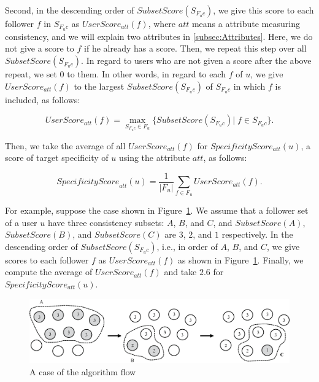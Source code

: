Second, in the descending order of $\mathit{SubsetScore}(S_{F_uc})$, we give
this score to each follower $f$ in $S_{F_uc}$ as
$\mathit{UserScore}_{\mathit{att}}(f)$, where $\mathit{att}$ means a
attribute measuring consistency, and we will explain two attributes in
\ref{subsec:Attributes}. Here, we do not give a score to $f$ if
he already has a score. Then, we repeat this step over all
$\mathit{SubsetScore}(S_{F_uc})$.  In regard to users who are not given
a score after the above repeat, we set $0$ to them.  In other words, in
regard to each $f$ of $u$, we give
$\mathit{UserScore}_{\mathit{att}}(f)$ to the largest
$\mathit{SubsetScore}(S_{F_uc})$ of $S_{F_uc}$ in which $f$ is included,
as follows:

\vspace{-1ex}
\[
 \mathit{UserScore}_{\mathit{att}}(f) = \max_{S_{F_uc} \in F_u}
 \{\mathit{SubsetScore}(S_{F_uc})|\;f \in S_{F_uc}\}.
\]
\vspace{-2ex}

Then, we take the average of all $\mathit{UserScore_{\mathit{att}}(f)}$ for
$\mathit{SpecificityScore_{\mathit{att}}(u)}$, a score of target
specificity of $u$ using the attribute $\mathit{att}$, as follows:

\vspace{-1ex}
\[
 \mathit{SpecificityScore}_{\mathit{att}}(u) = \frac{1}{|F_u|}
 \sum_{f \in F_u} \mathit{UserScore}_{\mathit{att}}(f).
\]
\vspace{-2ex}

For example, suppose the case shown in Figure~\ref{fig:Algorithm}.
We assume that a follower set of a user $u$ have three consistency
subsets: $A$, $B$, and $C$, and $\mathit{SubsetScore}(A)$,
$\mathit{SubsetScore}(B)$, and $\mathit{SubsetScore}(C)$ are $3$, $2$,
and $1$ respectively.  In the descending order of
$\mathit{SubsetScore}(S_{F_uc})$, i.e., in order of $A$, $B$, and $C$,
we give scores to each follower $f$ as
$\mathit{UserScore}_{\mathit{att}}(f)$ as shown in
Figure~\ref{fig:Algorithm}.  Finally, we compute the average of
$\mathit{UserScore}_{\mathit{att}}(f)$ and take $2.6$ for
$\mathit{SpecificityScore_{\mathit{att}}(u)}$.

{\footnotesize
\begin{figure}[t]
\begin{center}
\includegraphics[width=14cm]{images/algorithm.eps}
 \caption{A case of the algorithm flow}
\label{fig:Algorithm}
\end{center}
\end{figure}
}

